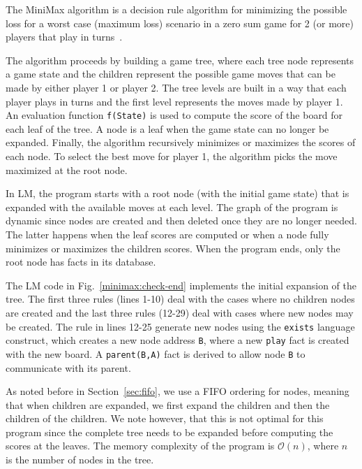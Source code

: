 The MiniMax algorithm is a decision rule algorithm for minimizing the
possible loss for a worst case (maximum loss) scenario in a zero sum
game for 2 (or more) players that play in
turns~\cite{Edwards54}.

The algorithm proceeds by building a game tree, where each tree node represents a
game state and the children represent the possible game moves that can
be made by either player 1 or player 2. The
tree levels are built in a way that each player plays in turns and the
first level represents the moves made by player 1.  An
evaluation function \texttt{f(State)} is used to compute the score of
the board for each leaf of the tree. A node is a leaf when the game state can no longer be
expanded. Finally, the
algorithm recursively minimizes or maximizes the scores of each node.
To select the best move for player 1, the
algorithm picks the move maximized at the root node.

In LM, the program starts with a root node (with the initial game state)
that is expanded with the available moves at each level. The graph of the
program is dynamic since nodes are created and then deleted once they are no
longer needed. The latter happens when the
leaf scores are computed or when a node fully minimizes or maximizes the
children scores. When the program ends, only the root node has facts in its
database.

The LM code in Fig.~\ref{minimax:check-end} implements
the initial expansion of the tree. The first three rules (lines 1-10) deal
with the cases where no children nodes are created and the last three rules
(12-29) deal with cases where new nodes may be created.
The rule in lines 12-25 generate new nodes using the
\texttt{exists} language construct, which creates a new node address
\texttt{B}, where a new \texttt{play} fact is created with the new
board. A \texttt{parent(B,A)} fact is derived to allow node \texttt{B} to
communicate with its parent.

As noted before in Section~\ref{sec:fifo}, we use a FIFO ordering for nodes,
meaning that when children are expanded, we first expand the children and
then the children of the children. We note
however, that this is not optimal for this program since the complete tree needs
to be expanded before computing the scores at the leaves. The memory
complexity of the program is $\mathcal{O}(n)$, where $n$ is the number of nodes
in the tree.

